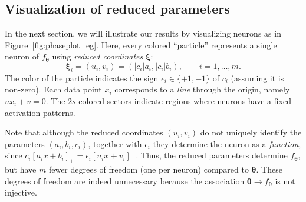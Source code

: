 \subsection{Visualization of reduced parameters}


In the next section, we will illustrate our results by visualizing neurons as in Figure~\ref{fig:phaseplot_eg}. Here, every colored ``particle'' represents a single neuron of $f_{\bm \theta}$ using \emph{reduced coordinates} $\bm \xi$:
\begin{equation}\label{eq:reduced_params}
\bm \xi_i = (u_i,v_i) = (|c_i|a_i,|c_i| b_i), \qquad i=1,\ldots,m.
\end{equation}
The color of the particle indicates the sign $\epsilon_i \in \{+1,-1\}$ of $c_i$ (assuming it is non-zero). Each data point $x_i$ corresponds to a \emph{line} through the origin, namely $u x_i + v =0$. The $2s$ colored sectors indicate regions where neurons have a fixed activation patterns.

Note that although the reduced coordinates $(u_i,v_i)$ do not uniquely identify the parameters $(a_i,b_i,c_i)$, together with $\epsilon_i$ they determine the neuron as a \emph{function}, since $c_i[a_i x + b_i]_+ = \epsilon_i[u_i x + v_i]_+$.
Thus, the reduced parameters determine $f_{\bm \theta}$, but have $m$ fewer degrees of freedom (one per neuron) compared to $\bm \theta$. These degrees of freedom are indeed unnecessary because the association $\bm \theta \rightarrow f_{\bm \theta}$ is not injective. 



